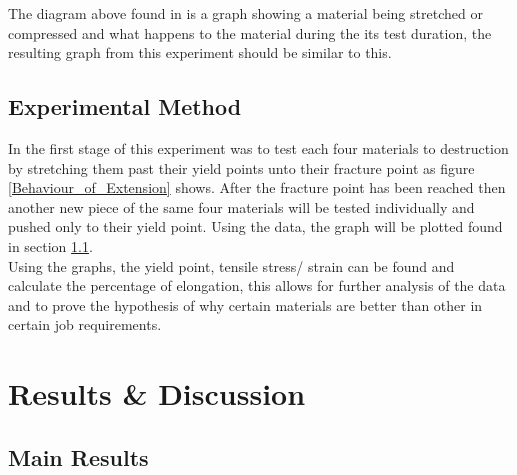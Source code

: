 \documentclass[11pt]{article}
\begin{document}
\begin{multicols}{2}
The diagram above found in \cite{LLR.2-2018} is a graph showing a material being stretched or compressed and what happens to the material during the its test duration, the resulting graph from this experiment should be similar to this.


\subsection{Experimental Method}
\label{Experimental Method SubSection}

In the first stage of this experiment was to test each four materials to destruction by stretching them past their yield points unto their fracture point as figure \ref{Behaviour_of_Extension} shows. After the fracture point has been reached then another new piece of the same four materials will be tested individually and pushed only to their yield point. Using the data, the graph will be plotted found in section \ref{Main Results SubSection}. \\

Using the graphs, the yield point, tensile stress/ strain can be found and calculate the percentage of elongation, this allows for further analysis of the data and to prove the hypothesis of why certain materials are better than other in certain job requirements.


\section{Results \& Discussion}
\label{Results Discussion Section}


\subsection{Main Results}
\label{Main Results SubSection}


\end{multicols}
\end{document}
